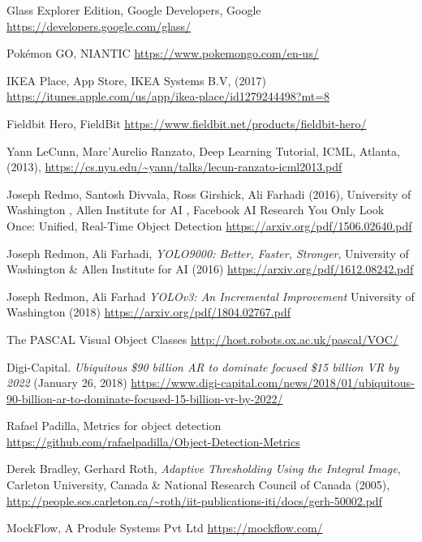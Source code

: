 \begin{thebibliography}{X}
Glass Explorer Edition, Google Developers, Google
\url{https://developers.google.com/glass/}

Pokémon GO, NIANTIC
\url{https://www.pokemongo.com/en-us/}


IKEA Place, App Store, IKEA Systems B.V, (2017)
\url{https://itunes.apple.com/us/app/ikea-place/id1279244498?mt=8}

Fieldbit Hero, FieldBit
\url{https://www.fieldbit.net/products/fieldbit-hero/}

Yann LeCunn, Marc'Aurelio Ranzato, Deep Learning Tutorial, ICML, Atlanta, (2013), 
\url{https://cs.nyu.edu/~yann/talks/lecun-ranzato-icml2013.pdf}

Joseph Redmo, Santosh Divvala, Ross Girshick, Ali Farhadi (2016), University of Washington
, Allen Institute for AI
, Facebook AI Research
You Only Look Once: Unified, Real-Time Object Detection
\url{https://arxiv.org/pdf/1506.02640.pdf} 

Joseph Redmon, Ali Farhadi, \textit{YOLO9000:
Better, Faster, Stronger}, 
University of Washington \& Allen Institute for AI (2016)
\url{https://arxiv.org/pdf/1612.08242.pdf}

Joseph Redmon, Ali Farhad
\textit{YOLOv3: An Incremental Improvement}
University of Washington (2018)
\url{https://arxiv.org/pdf/1804.02767.pdf}

The PASCAL Visual Object Classes
\url{http://host.robots.ox.ac.uk/pascal/VOC/}

Digi-Capital. \textit{Ubiquitous  \$90 billion AR to dominate focused \$15 billion VR by 2022}
(January 26, 2018)
\url{https://www.digi-capital.com/news/2018/01/ubiquitous-90-billion-ar-to-dominate-focused-15-billion-vr-by-2022/}

Rafael Padilla, Metrics for object detection
\url{https://github.com/rafaelpadilla/Object-Detection-Metrics}

Derek Bradley, Gerhard Roth, \textit{Adaptive Thresholding Using the Integral Image},
Carleton University, Canada \& National Research Council of Canada (2005), 
\url{http://people.scs.carleton.ca/~roth/iit-publications-iti/docs/gerh-50002.pdf}

MockFlow,  A Produle Systems Pvt Ltd 
 \url{https://mockflow.com/}

\end{thebibliography}
